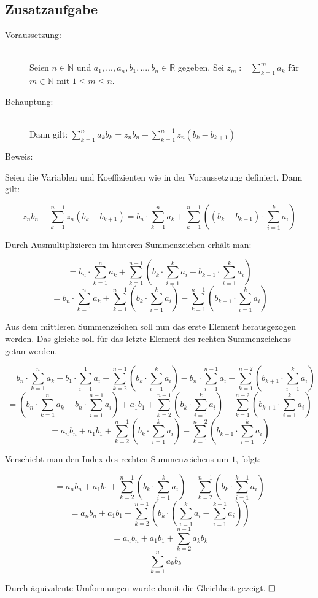 \documentclass[11pt, a4paper]{article}
\begin{document}
	\newpage

	\subsection*{Zusatzaufgabe}

		\begin{description}
			\item[Voraussetzung:] \hfill \\
				Seien $n \in \mathbb{N}$ und $a_1,...,a_n,b_1,...,b_n \in \mathbb{R}$ gegeben. Sei $z_m := \sum_{k=1}^m a_k$ für $m \in \mathbb{N}$ mit $1\leq m\leq n$.\hfill 
			\item[Behauptung:] \hfill \\
				Dann gilt: $\sum_{k=1}^n a_kb_k = z_nb_n + \sum_{k=1}^{n-1} z_n(b_k - b_{k+1})$ \hfill
			\item[Beweis:] 
		\end{description}

		Seien die Variablen und Koeffizienten wie in der Voraussetzung definiert. Dann gilt:

		\[ z_nb_n + \sum_{k=1}^{n-1} z_n(b_k - b_{k+1}) =  b_n\cdot\sum_{k=1}^n a_k  +  \sum_{k=1}^{n-1}\left( (b_k - b_{k+1})\cdot \sum_{i=1}^k a_i \right) \]

		Durch Ausmultiplizieren im hinteren Summenzeichen erhält man:

		\[ = b_n\cdot\sum_{k=1}^n a_k  +  \sum_{k=1}^{n-1}\left( b_k\cdot \sum_{i=1}^k a_i -b_{k+1}\cdot \sum_{i=1}^k a_i \right) \]
		\[ = b_n\cdot\sum_{k=1}^n a_k  +  \sum_{k=1}^{n-1}\left( b_k\cdot \sum_{i=1}^k a_i \right) - \sum_{k=1}^{n-1} \left(b_{k+1}\cdot \sum_{i=1}^k a_i \right) \]

		Aus dem mittleren Summenzeichen soll nun das erste Element herausgezogen werden. Das gleiche soll für das letzte Element des rechten Summenzeichens getan werden.

		\[ = b_n\cdot\sum_{k=1}^n a_k  + b_1\cdot\sum_{i=1}^1a_i + \sum_{k=2}^{n-1}\left( b_k\cdot \sum_{i=1}^k a_i \right) - b_n\cdot\sum_{i=1}^{n-1}a_i - \sum_{k=1}^{n-2} \left(b_{k+1}\cdot \sum_{i=1}^k a_i \right) \]
		\[ = \left(b_n\cdot\sum_{k=1}^n a_k - b_n\cdot\sum_{i=1}^{n-1}a_i \right) + a_1b_1 + \sum_{k=2}^{n-1}\left( b_k\cdot \sum_{i=1}^k a_i \right) - \sum_{k=1}^{n-2} \left(b_{k+1}\cdot \sum_{i=1}^k a_i \right) \]
		\[ = a_nb_n + a_1b_1 + \sum_{k=2}^{n-1}\left( b_k\cdot \sum_{i=1}^k a_i \right) - \sum_{k=1}^{n-2} \left(b_{k+1}\cdot \sum_{i=1}^k a_i \right) \]

		Verschiebt man den Index des rechten Summenzeichens um $1$, folgt:

		\[ = a_nb_n + a_1b_1 + \sum_{k=2}^{n-1}\left( b_k\cdot \sum_{i=1}^k a_i \right) - \sum_{k=2}^{n-1} \left(b_{k}\cdot \sum_{i=1}^{k-1} a_i \right) \]
		\[ = a_nb_n + a_1b_1 + \sum_{k=2}^{n-1}\left( b_k\cdot \left(\sum_{i=1}^k a_i  - \sum_{i=1}^{k-1} a_i \right) \right) \]
		\[ = a_nb_n + a_1b_1 + \sum_{k=2}^{n-1} a_kb_k \]
		\[ = \sum_{k=1}^n a_kb_k \]

		Durch äquivalente Umformungen wurde damit die Gleichheit gezeigt. $\hfill\Box$
\end{document}
